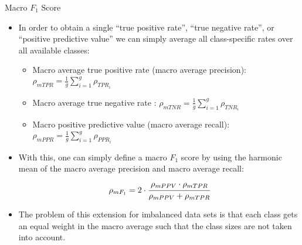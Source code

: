 \begin{vbframe}{Macro $F_1$ Score}
	\footnotesize{
	\begin{itemize}
%		
		\item In order to obtain a single ``true positive rate'',  ``true negative rate'', or ``positive predictive value'' we can simply average all class-specific rates over all available classes:
		\begin{itemize}
			\footnotesize
			\item Macro average true positive rate (macro average precision): $\rho_{mTPR} = \frac{1}{g}\sum_{i=1}^g  \rho_{TPR_i}$
			\item Macro average true negative rate : $\rho_{mTNR} = \frac{1}{g}\sum_{i=1}^g  \rho_{TNR_i}$
			\item Macro positive predictive value (macro average recall): $\rho_{mPPR} = \frac{1}{g}\sum_{i=1}^g  \rho_{PPR_i}$
		\end{itemize}
		\item With this, one can simply define a macro $F_1$ score by using the harmonic mean of the macro average precision and macro average recall:
		$$\rho_{mF_1} = 2 \cdot \cfrac{\rho_{mPPV} \cdot \rho_{mTPR}}{\rho_{mPPV} + 
			\rho_{mTPR}}$$
		\item The problem of this extension for imbalanced data sets is that each class gets an equal weight in the macro average such that the class sizes are not taken into account.
%
	\end{itemize}
	}
\end{vbframe}

